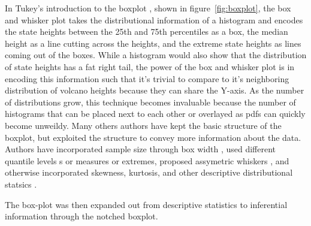 In Tukey's introduction to the boxplot \cite{tukey77e}, shown in
figure~\ref{fig:boxplot}, the box and whisker plot takes the distributional information of a histogram and encodes the state heights between the
25th and 75th percentiles as a box, the median height as a line cutting across
the heights, and the extreme state heights as lines coming out of the
boxes. While a histogram would also show that the distribution of state heights has a fat right tail,
the power of the box and whisker plot is in encoding this information such that
it's trivial to compare to it's neighboring distribution of volcano
heights because they can share the Y-axis. As the number of distributions grow,
this technique becomes invaluable because the number of histograms that can be
placed next to each other or overlayed as pdfs can quickly become
unweildy.  Many others authors have kept the basic structure of the boxplot,
but exploited the structure to convey more information about the data. Authors
have incorporated sample size through box width \cite{mcgill1978}, used
different quantile levels \cite{Hyndman}s or measures or extremes\cite{Frigge,
carter}, proposed assymetric whiskers \cite{Rousseuw}, and otherwise incorporated skewness, kurtosis, and other descriptive distributional statsics \cite{ Aslam, choon, Marmelejo}.


The box-plot was then expanded out from descriptive statistics to inferential
information through the notched boxplot. \cite{mcgill1978} 










